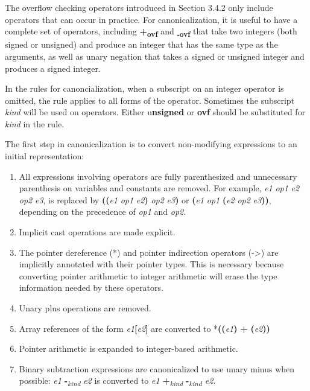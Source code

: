 \documentclass[]{article}
\begin{document}
The overflow checking operators introduced in Section 3.4.2 only include
operators that can occur in practice. For canonicalization, it is useful
to have a complete set of operators, including
\textbf{+\textsubscript{ovf}} and \textbf{\textsubscript{-ovf}} that
take two integers (both signed or unsigned) and produce an integer that
has the same type as the arguments, as well as unary negation that takes
a signed or unsigned integer and produces a signed integer.

In the rules for canoncialization, when a subscript on an integer
operator is omitted, the rule applies to all forms of the operator.
Sometimes the subscript \emph{kind} will be used on operators. Either
u\textbf{nsigned} or \textbf{ovf} should be substituted for \emph{kind}
in the rule.

The first step in canonicalization is to convert non-modifying
expressions to an initial representation:

\begin{enumerate}
\def\labelenumi{\arabic{enumi}.}
\item
  All expressions involving operators are fully parenthesized and
  unnecessary parenthesis on variables and constants are removed. For
  example, \emph{e1} \emph{op1} \emph{e2} \emph{op2} \emph{e3}, is
  replaced by \textbf{((}\emph{e1} \emph{op1} \emph{e2}\textbf{)}
  \emph{op2} \emph{e3}\textbf{)} or \textbf{(}\emph{e1} \emph{op1}
  \textbf{(}\emph{e2} \emph{op2} \emph{e3}\textbf{))}, depending on the
  precedence of \emph{op1} and \emph{op2}.
\item
  Implicit cast operations are made explicit.
\item
  The pointer dereference (*) and pointer indirection operators
  (-\textgreater{}) are implicitly annotated with their pointer types.
  This is necessary because converting pointer arithmetic to integer
  arithmetic will erase the type information needed by these operators.
\item
  Unary plus operations are removed.
\item
  Array references of the form
  \emph{e1}\textbf{{[}}\emph{e2}\textbf{{]}} are converted to
  *\textbf{((}\emph{e1}\textbf{)} \textbf{+}
  \textbf{(}\emph{e2}\textbf{))}
\item
  Pointer arithmetic is expanded to integer-based arithmetic.
\item
  Binary subtraction expressions are canonicalized to use unary minus
  when possible: \emph{e1} \textbf{-}\emph{\textsubscript{kind}}
  \emph{e2} is converted to \emph{e1}
  \textbf{+}\emph{\textsubscript{kind}}
  \textbf{-}\emph{\textsubscript{kind} e2}.
\end{enumerate}
\end{document}
